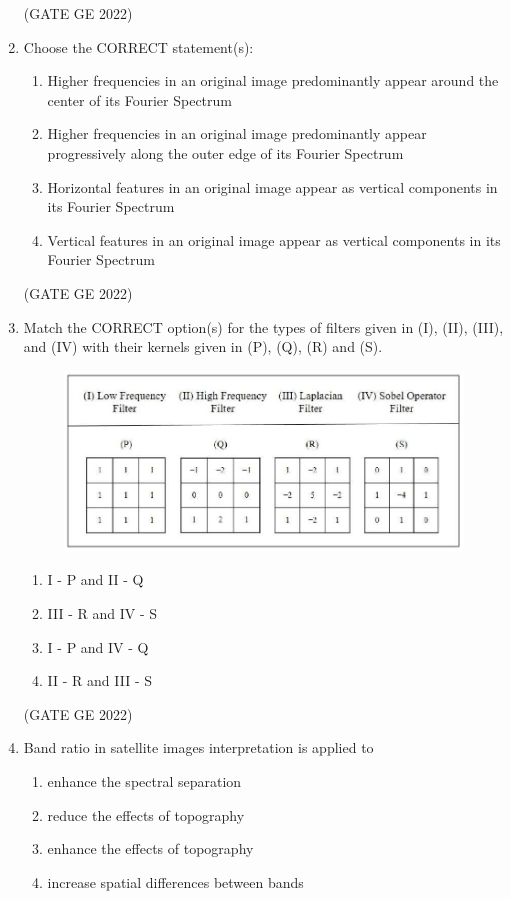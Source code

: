 \documentclass[a4paper, 11pt]{article}
\begin{document}
\begin{enumerate}
\hfill (GATE GE 2022)

\item Choose the CORRECT statement(s):
\begin{enumerate}
    \item Higher frequencies in an original image predominantly appear around the center of its Fourier Spectrum
    \item Higher frequencies in an original image predominantly appear progressively along the outer edge of its Fourier Spectrum
    \item Horizontal features in an original image appear as vertical components in its Fourier Spectrum
    \item Vertical features in an original image appear as vertical components in its Fourier Spectrum
\end{enumerate}

\hfill (GATE GE 2022)

\item Match the CORRECT option(s) for the types of filters given in (I), (II), (III), and (IV) with their kernels given in (P), (Q), (R) and (S).
\begin{figure}[H]
    \centering
    \includegraphics[width=\columnwidth]{figs/fig_78.png}
    \label{fig:placeholder}
\end{figure}
\begin{enumerate}
    \item I - P and II - Q
    \item III - R and IV - S
    \item I - P and IV - Q
    \item II - R and III - S
\end{enumerate}

\hfill (GATE GE 2022)

\item Band ratio in satellite images interpretation is applied to
\begin{enumerate}
    \item enhance the spectral separation
    \item reduce the effects of topography
    \item enhance the effects of topography
    \item increase spatial differences between bands
\end{enumerate}


\end{enumerate}
\end{document}
